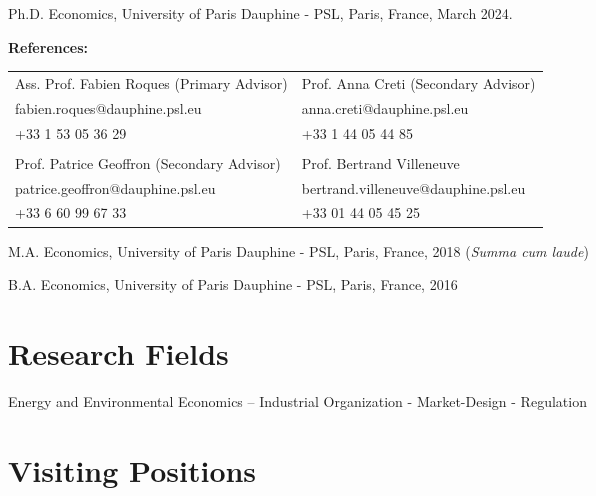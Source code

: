 \documentclass[letterpaper]{article}
\renewenvironment{itemize}{
  \begin{list}{}{
    \setlength{\leftmargin}{1.5em}
  }
}{
  \end{list}
}
\begin{document}
\begin{itemize}
  \item Ph.D. Economics, University of Paris Dauphine - PSL, Paris, France, March 2024.
  \item

\textbf{References:}

\begin{table}[h!]
\centering
\begin{tabular}{p{8cm} p{7cm}}
Ass. Prof. Fabien Roques (Primary Advisor) & Prof. Anna Creti (Secondary Advisor)       \\
fabien.roques@dauphine.psl.eu     & anna.creti@dauphine.psl.eu \\
+33 1 53 05 36 29                 & +33 1 44 05 44 85          \\
                                  &                            \\
Prof. Patrice Geoffron (Secondary Advisor)        &  Prof. Bertrand Villeneuve                                    \\
patrice.geoffron@dauphine.psl.eu  & bertrand.villeneuve@dauphine.psl.eu                           \\
+33 6 60 99 67 33                 & +33 01 44 05 45 25                           
\end{tabular}
\end{table}

  \item M.A. Economics, University of Paris Dauphine - PSL, Paris, France, 2018  (\textit{Summa cum laude})
  
  \item B.A. Economics, University of Paris Dauphine - PSL, Paris, France, 2016

\end{itemize}

\section*{\textbf{Research Fields}}

\begin{itemize}
\item Energy and Environmental Economics – Industrial Organization - Market-Design - Regulation
\end{itemize}

\section*{\textbf{Visiting Positions}}
\end{document}
